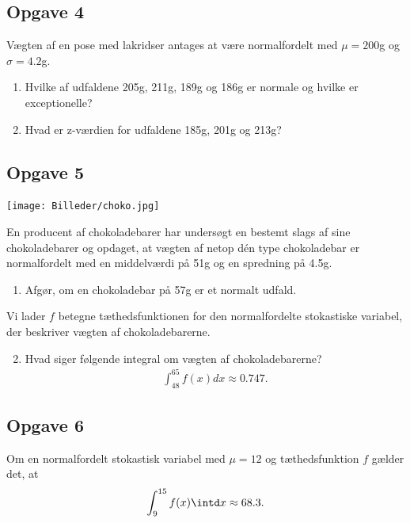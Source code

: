 \subsection*{Opgave 4}

Vægten af en pose med lakridser antages at være normalfordelt med $\mu = 200$g og $\sigma = 4.2$g.

\begin{enumerate}[label=\roman*)]
	\item Hvilke af udfaldene 205g, 211g, 189g og 186g er normale og hvilke er exceptionelle?
	\item Hvad er z-værdien for udfaldene 185g, 201g og 213g?
\end{enumerate}

\subsection*{Opgave 5}


	\begin{center}
		\texttt{[image: Billeder/choko.jpg]}
	\end{center}
	En producent af chokoladebarer har undersøgt en bestemt slags af sine chokoladebarer og opdaget, at vægten af netop dén type chokoladebar er normalfordelt
	med en middelværdi på 51g og en spredning på 4.5g.
\begin{enumerate}[label=\roman*)]
	\item Afgør, om en chokoladebar på 57g er et normalt udfald. 
\end{enumerate}

	
Vi lader $f$ betegne tæthedsfunktionen for den normalfordelte stokastiske variabel, der beskriver vægten af chokoladebarerne. 
\begin{enumerate}[label=\roman*)]
	\setcounter{enumi}{1}
	\item Hvad siger følgende integral om vægten af chokoladebarerne?
	\begin{align*}
		\int_{48}^{65} f(x)dx \approx  0.747.
	\end{align*}
\end{enumerate}

\subsection*{Opgave 6}

Om en normalfordelt stokastisk variabel med $\mu = 12$ og tæthedsfunktion $f$ gælder det, at
\begin{align*}
	\int_9^{15} f(x) \intd x \approx 68.3.
\end{align*}
	
